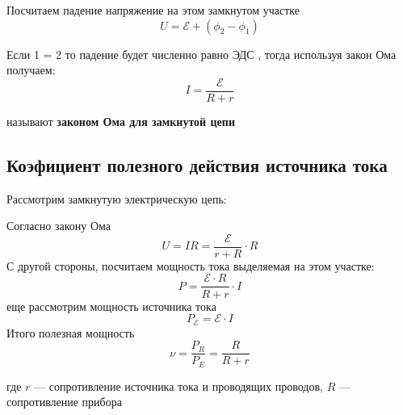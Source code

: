 \documentclass[../main.tex]{subfiles}
\begin{document}
Посчитаем падение напряжение на этом замкнутом участке
\[U = \mathscr{E} + (\phi_2 - \phi_1)\]

 Если 1 = 2 то падение будет численно равно ЭДС , тогда используя закон Ома получаем:
\[I = \frac{\mathscr{E}}{R + r}\]
\begin{center}
    называют \textbf{законом Ома для замкнутой цепи}
\end{center}


\subsection{Коэфициент полезного действия источника тока}
Рассмотрим замкнутую электрическую цепь:

\begin{center}


\end{center}

Согласно закону Ома
\[ U = IR = \frac{\mathscr{E}}{r+R} \cdot R \]
С другой стороны, посчитаем мощность тока выделяемая на этом участке:
\[P = \frac{\mathscr{E} \cdot R}{R+r} \cdot I\]
еще рассмотрим мощность источника тока
\[P_{\mathscr{E}} = \mathscr{E} \cdot I\]
Итого полезная мощность
\[\nu = \frac{P_R}{P_E} = \frac{R}{R+r}\]
\begin{center}
    где $r$ --- сопротивление источника тока и проводящих проводов, $R$ --- сопротивление прибора
\end{center}
\end{document}
